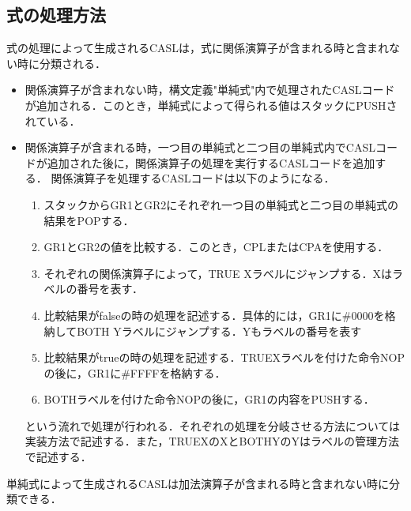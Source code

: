 \documentclass[dvipdfmx]{jarticle}
\begin{document}
\subsection{式の処理方法}
式の処理によって生成されるCASLは，式に関係演算子が含まれる時と含まれない時に分類される．
\begin{itemize}
  \item 関係演算子が含まれない時，構文定義"単純式"内で処理されたCASLコードが追加される．このとき，単純式によって得られる値はスタックにPUSHされている．
  \item 関係演算子が含まれる時，一つ目の単純式と二つ目の単純式内でCASLコードが追加された後に，関係演算子の処理を実行するCASLコードを追加する．
  関係演算子を処理するCASLコードは以下のようになる．
  \begin{enumerate}
    \item スタックからGR1とGR2にそれぞれ一つ目の単純式と二つ目の単純式の結果をPOPする．
    \item GR1とGR2の値を比較する．このとき，CPLまたはCPAを使用する．
    \item それぞれの関係演算子によって，TRUE Xラベルにジャンプする．Xはラベルの番号を表す．
    \item 比較結果がfalseの時の処理を記述する．具体的には，GR1に\#0000を格納してBOTH Yラベルにジャンプする．Yもラベルの番号を表す
    \item 比較結果がtrueの時の処理を記述する．TRUEXラベルを付けた命令NOPの後に，GR1に\#FFFFを格納する．
    \item BOTHラベルを付けた命令NOPの後に，GR1の内容をPUSHする．
  \end{enumerate}
  という流れで処理が行われる．それぞれの処理を分岐させる方法については実装方法で記述する．また，TRUEXのXとBOTHYのYはラベルの管理方法で記述する．
\end{itemize}
  単純式によって生成されるCASLは加法演算子が含まれる時と含まれない時に分類できる．
\end{document}
